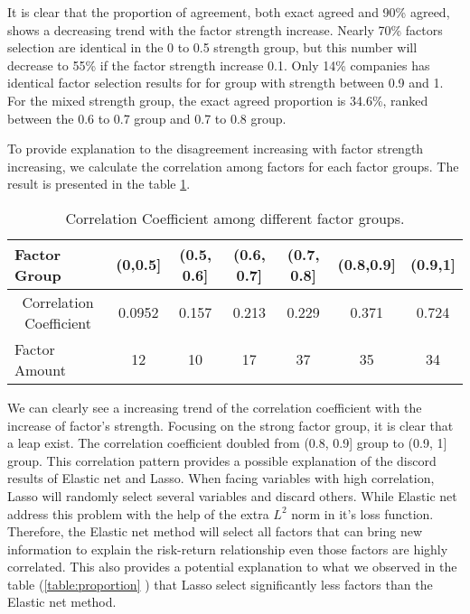 It is clear that the proportion of agreement, both exact agreed and 90\% agreed, shows a decreasing trend with the factor strength increase.
Nearly 70\% factors selection are identical in the 0 to 0.5 strength group, but this number will decrease to 55\% if the factor strength increase 0.1.
Only 14\% companies has identical factor selection results for for group with strength between 0.9 and 1.
For the mixed strength group, the exact agreed proportion is 34.6\%, ranked between the 0.6 to 0.7 group and 0.7 to 0.8 group.

To provide explanation to the disagreement increasing with factor strength increasing, we calculate the correlation among factors for each factor groups.
The result is presented in the table \ref{table:Correlation}.
\begin{table}[h]
	\centering
	\caption{Correlation Coefficient among different factor groups. }
	\label{table:Correlation}
	\begin{tabular}{l|cccccc}
		\hline
		\hline
		Factor Group                                 & (0,0.5{]} & (0.5, 0.6{]} & (0.6, 0.7{]} & (0.7, 0.8{]} & (0.8,0.9{]} & (0.9,1{]} \\ \hline
		\multicolumn{1}{c|}{Correlation Coefficient} & 0.0952    & 0.157        & 0.213        & 0.229        & 0.371       & 0.724   \\
		Factor Amount &12 & 10 &  17 & 37& 35 &34  \\ \hline \hline
	\end{tabular}
\end{table}
We can clearly see a increasing trend of the correlation coefficient with the increase of factor's strength.
Focusing on the strong factor group, it is clear that a leap exist.
The correlation coefficient doubled from (0.8, 0.9] group to (0.9, 1] group.
This correlation pattern provides a possible explanation of the discord results of Elastic net and Lasso.
When facing variables with high correlation, Lasso will randomly select several variables and discard others.
While Elastic net address this problem with the help of the extra $L^2$ norm in it's loss function.
Therefore, the Elastic net method will select all factors that can bring new information to explain the risk-return relationship even those factors are highly correlated.
This also provides a potential explanation to what we observed in the table (\ref{table:proportion} ) that Lasso select significantly less factors than the Elastic net method.
